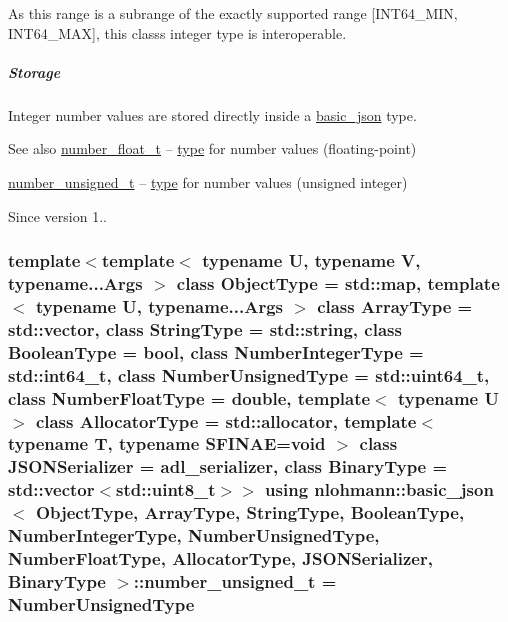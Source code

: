 As this range is a subrange of the exactly supported range \mbox{[}I\+N\+T64\+\_\+\+M\+IN, I\+N\+T64\+\_\+\+M\+AX\mbox{]}, this class\textquotesingle{}s integer type is interoperable.

\subparagraph*{Storage}

Integer number values are stored directly inside a \hyperlink{classnlohmann_1_1basic__json}{basic\+\_\+json} type.

\begin{DoxySeeAlso}{See also}
\hyperlink{classnlohmann_1_1basic__json_a5b8abaebd922d82d69756327c0c347e6}{number\+\_\+float\+\_\+t} -- \hyperlink{classnlohmann_1_1basic__json_a5b7c4b35a0ad9f97474912a08965d7ad}{type} for number values (floating-\/point)

\hyperlink{classnlohmann_1_1basic__json_ae09af9c23351b7245d9be4d1b2035fef}{number\+\_\+unsigned\+\_\+t} -- \hyperlink{classnlohmann_1_1basic__json_a5b7c4b35a0ad9f97474912a08965d7ad}{type} for number values (unsigned integer)
\end{DoxySeeAlso}
\begin{DoxySince}{Since}
version 1.. 
\end{DoxySince}
\subsubsection[{\texorpdfstring{number\+\_\+unsigned\+\_\+t}{number_unsigned_t}}]{\setlength{\rightskip}{0pt plus 5cm}template$<$template$<$ typename U, typename V, typename...\+Args $>$ class Object\+Type = std\+::map, template$<$ typename U, typename...\+Args $>$ class Array\+Type = std\+::vector, class String\+Type  = std\+::string, class Boolean\+Type  = bool, class Number\+Integer\+Type  = std\+::int64\+\_\+t, class Number\+Unsigned\+Type  = std\+::uint64\+\_\+t, class Number\+Float\+Type  = double, template$<$ typename U $>$ class Allocator\+Type = std\+::allocator, template$<$ typename T, typename S\+F\+I\+N\+A\+E=void $>$ class J\+S\+O\+N\+Serializer = adl\+\_\+serializer, class Binary\+Type  = std\+::vector$<$std\+::uint8\+\_\+t$>$$>$ using {\bf nlohmann\+::basic\+\_\+json}$<$ Object\+Type, Array\+Type, String\+Type, Boolean\+Type, Number\+Integer\+Type, Number\+Unsigned\+Type, Number\+Float\+Type, Allocator\+Type, J\+S\+O\+N\+Serializer, Binary\+Type $>$\+::{\bf number\+\_\+unsigned\+\_\+t} =  Number\+Unsigned\+Type}\hypertarget{classnlohmann_1_1basic__json_ae09af9c23351b7245d9be4d1b2035fef}{}\label{classnlohmann_1_1basic__json_ae09af9c23351b7245d9be4d1b2035fef}


